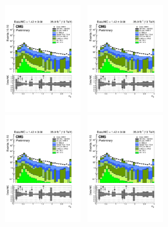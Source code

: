 \begin{figure}[h!]
\begin{center}
    \includegraphics[width=0.3\textwidth,page=1,trim=0 100 50 100,clip]{figures/SITV/Event/Event.pdf}~
    \includegraphics[width=0.3\textwidth,page=2,trim=0 100 50 100,clip]{figures/SITV/Event/Event.pdf}\\
    \includegraphics[width=0.3\textwidth,page=11,trim=0 100 50 100,clip]{figures/SITV/Event/Event.pdf}~
    \includegraphics[width=0.3\textwidth,page=9,trim=0 100 50 100,clip]{figures/SITV/Event/Event.pdf}~

\end{center}
\end{figure}
